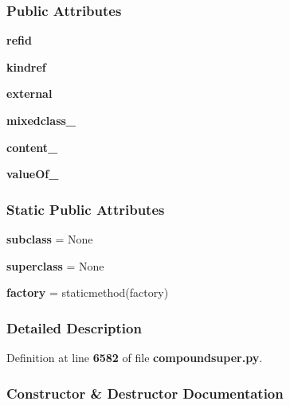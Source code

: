 \subsubsection*{Public Attributes}
\begin{DoxyCompactItemize}
\item 
{\bf refid}
\item 
{\bf kindref}
\item 
{\bf external}
\item 
{\bf mixedclass\+\_\+}
\item 
{\bf content\+\_\+}
\item 
{\bf value\+Of\+\_\+}
\end{DoxyCompactItemize}
\subsubsection*{Static Public Attributes}
\begin{DoxyCompactItemize}
\item 
{\bf subclass} = None
\item 
{\bf superclass} = None
\item 
{\bf factory} = staticmethod(factory)
\end{DoxyCompactItemize}


\subsubsection{Detailed Description}


Definition at line {\bf 6582} of file {\bf compoundsuper.\+py}.



\subsubsection{Constructor \& Destructor Documentation}
